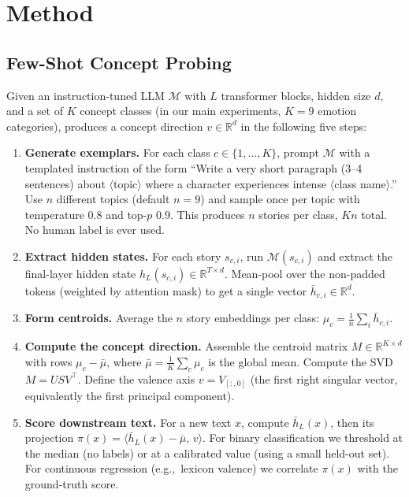 \section{Method}
\label{sec:method}

\subsection{Few-Shot Concept Probing}

Given an instruction-tuned LLM $\mathcal{M}$ with $L$ transformer blocks, hidden
size $d$, and a set of $K$ concept classes (in our main experiments, $K=9$
emotion categories), \ours produces a concept direction $v \in \mathbb{R}^d$
in the following five steps:

\begin{enumerate}[leftmargin=*]
\item \textbf{Generate exemplars.} For each class $c \in \{1, \dots, K\}$, prompt
$\mathcal{M}$ with a templated instruction of the form ``Write a very short
paragraph (3--4 sentences) about $\langle$topic$\rangle$ where a character
experiences intense $\langle$class name$\rangle$.'' Use $n$ different topics
(default $n=9$) and sample once per topic with temperature $0.8$ and top-$p$
$0.9$. This produces $n$ stories per class, $Kn$ total. No human label is
ever used.

\item \textbf{Extract hidden states.} For each story $s_{c,i}$, run
$\mathcal{M}(s_{c,i})$ and extract the final-layer hidden state
$h_L(s_{c,i}) \in \mathbb{R}^{T \times d}$. Mean-pool over the non-padded
tokens (weighted by attention mask) to get a single vector
$\bar h_{c,i} \in \mathbb{R}^d$.

\item \textbf{Form centroids.} Average the $n$ story embeddings per class:
$\mu_c = \frac{1}{n} \sum_i \bar h_{c,i}$.

\item \textbf{Compute the concept direction.} Assemble the centroid matrix
$M \in \mathbb{R}^{K \times d}$ with rows $\mu_c - \bar\mu$, where
$\bar\mu = \frac{1}{K}\sum_c \mu_c$ is the global mean. Compute the SVD
$M = U S V^\top$. Define the valence axis $v = V_{[:, 0]}$ (the first
right singular vector, equivalently the first principal component).

\item \textbf{Score downstream text.} For a new text $x$, compute $\bar h_L(x)$,
then its projection
$\pi(x) = \langle \bar h_L(x) - \bar\mu, \, v \rangle$. For binary
classification we threshold at the median (no labels) or at a calibrated
value (using a small held-out set). For continuous regression (e.g.,\
lexicon valence) we correlate $\pi(x)$ with the ground-truth score.
\end{enumerate}


